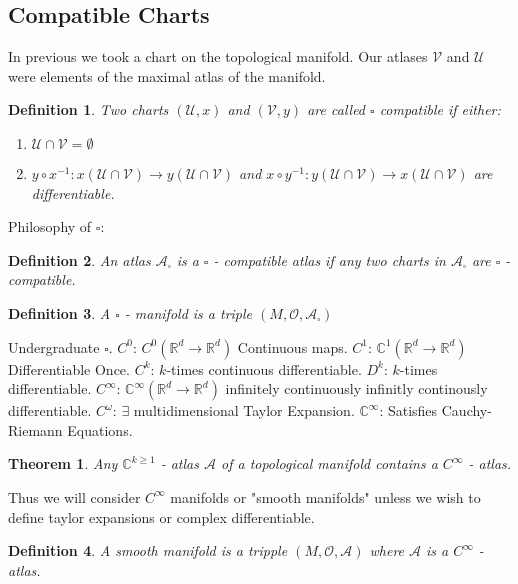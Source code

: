 \documentclass[10pt, oneside]{article}
\newcommand{\R}{\mathbb{R}}
\newcommand{\C}{\mathbb{C}}
\newtheorem{thm}{Theorem}
\newtheorem{defn}{Definition}
\begin{document}
  \subsection{Compatible Charts}
     In previous we took a chart on the topological manifold. Our atlases $\mathcal{V}$ and $\mathcal{U}$ were elements of the maximal atlas of the manifold.
     \begin{defn}
        Two charts $(\mathcal{U},x)$ and $(\mathcal{V},y)$ are called $\square$ compatible if either:
        \begin{enumerate}
        \item $\mathcal{U} \cap \mathcal{V} = \emptyset$
        \item $y \circ x^{-1}: x(\mathcal{U} \cap \mathcal{V}) \to y(\mathcal{U} \cap \mathcal{V})$ and $x \circ y^{-1}: y(\mathcal{U} \cap \mathcal{V}) \to x(\mathcal{U} \cap \mathcal{V})$ are differentiable.
        \end{enumerate}
     \end{defn}
     Philosophy of $\square$:
        \begin{defn}
           An atlas $\mathcal{A}_\square$ is a $\square$ - compatible atlas if any two charts in $\mathcal{A}_\square$ are $\square$ - compatible.
        \end{defn}
        \begin{defn}
           A $\square$ - manifold is a triple $(M, \mathcal{O}, \mathcal{A}_\square)$
        \end{defn}
     Undergraduate $\square$. $C^0$: $C^0 (\R^d \to \R^d)$ Continuous maps. $C^1$: $\C^1 (\R^d \to \R^d)$ Differentiable Once. $C^k$: $k$-times continuous differentiable.
     $D^k$: $k$-times differentiable. $C^\infty$: $\C^\infty (\R^d \to \R^d)$ infinitely continuously infinitly continously differentiable. $C^\omega$: $\exists$ multidimensional Taylor Expansion.
     $\C^\infty$: Satisfies Cauchy-Riemann Equations.
     \begin{thm}
        Any $\C^{k \geq 1}$ - atlas $\mathcal{A}$ of a topological manifold contains a $C^\infty$ - atlas.
     \end{thm}
     Thus we will consider $C^\infty$ manifolds or "smooth manifolds" unless we wish to define taylor expansions or complex differentiable.
     \begin{defn}
        A smooth manifold is a tripple $(M, \mathcal{O}, \mathcal{A})$ where $\mathcal{A}$ is a $C^\infty$ - atlas.
     \end{defn}
\end{document}
